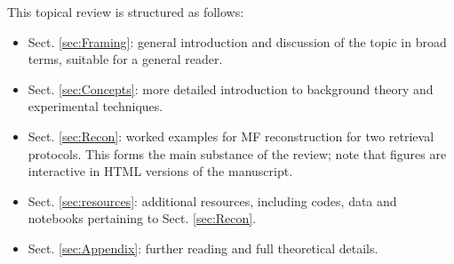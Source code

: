 This topical review is structured as follows:

\begin{itemize}
\item Sect. \ref{sec:Framing}: general introduction and discussion of the topic in broad terms, suitable for a general reader.
\item Sect. \ref{sec:Concepts}: more detailed introduction to background theory and experimental techniques.
\item Sect. \ref{sec:Recon}: worked examples for MF reconstruction for two retrieval protocols. This forms the main substance of the review; note that figures are interactive in HTML versions of the manuscript.
\item Sect. \ref{sec:resources}: additional resources, including codes, data and notebooks pertaining to Sect. \ref{sec:Recon}.
\item Sect. \ref{sec:Appendix}: further reading and full theoretical details.
\end{itemize}





